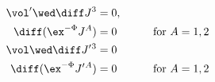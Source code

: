 \begin{equation}
\label{su2su2conds}
\begin{aligned}
   \vol' \wed \diff J^3 & =  0 , \\
   \diff (\ex^{-\Phi}J^{A})  & =  0 && \qquad \text{for $A=1,2$}\\
   \vol \wed \diff J'{}^3 & =  0\\
   \diff (\ex^{-\Phi} J'{}^A)  & =  0 && \qquad \text{for $A=1,2$}
\end{aligned}
\end{equation}

